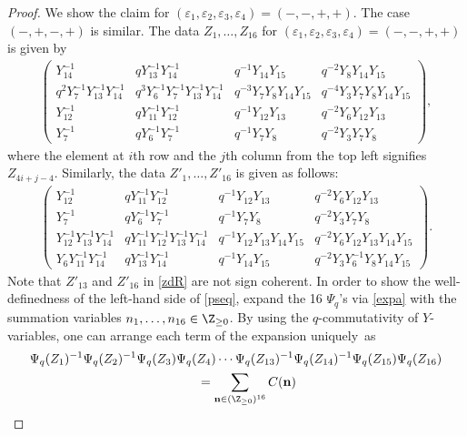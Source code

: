 \begin{proof}
 We show the claim for
 $(\varepsilon_1,\varepsilon_2,\varepsilon_3,\varepsilon_4)
 =(-,-,+,+)$. The case $(-,+,-,+)$ is similar. The data $Z_1,
 \dots, Z_{16}$ for
 $(\varepsilon_1,\varepsilon_2,\varepsilon_3,\varepsilon_4)=(-,-,+,+)$
 is given by
\begin{align}\label{zdL}
\begin{pmatrix}
Y_{14}^{-1} &
qY^{-1}_{13}Y^{-1}_{14} &
q^{-1}Y_{14}Y_{15} &
q^{-2}Y_{8}Y_{14}Y_{15}
\\
q^{2}Y^{-1}_7Y^{-1}_{13}Y^{-1}_{14} &
q^3Y^{-1}_6Y^{-1}_7Y^{-1}_{13}Y^{-1}_{14} &
q^{-3}Y_7Y_8Y_{14}Y_{15} &
q^{-4}Y_3Y_7Y_8Y_{14}Y_{15}
\\
Y^{-1}_{12} &
qY^{-1}_{11}Y^{-1}_{12} &
q^{-1}Y_{12}Y_{13}&
q^{-2}Y_6Y_{12} Y_{13}
\\
Y^{-1}_{7} &
qY^{-1}_6Y^{-1}_7 &
q^{-1}Y_7Y_8 &
q^{-2}Y_3Y_7Y_8
\end{pmatrix},
\end{align}
where the element at $i$th row and the $j$th column from the top left signifies
$Z_{4i+j-4}$.
%
Similarly,
the data $Z'_1, \dotsc, Z'_{16}$
is given as follows:
\begin{align}\label{zdR}
\begin{pmatrix}
Y^{-1}_{12} &
qY^{-1}_{11}Y^{-1}_{12} &
q^{-1}Y_{12} Y_{13}&
q^{-2}Y_6Y_{12} Y_{13}
\\
Y^{-1}_7 &
qY^{-1}_6Y^{-1}_7 &
q^{-1}Y_7Y_8 &
q^{-2}Y_3Y_7Y_8
\\
Y^{-1}_{12}Y^{-1}_{13}Y^{-1}_{14} &
qY^{-1}_{11}Y^{-1}_{12}Y^{-1}_{13}Y^{-1}_{14} &
q^{-1}Y_{12} Y_{13} Y_{14} Y_{15} &
q^{-2}Y_6Y_{12} Y_{13} Y_{14} Y_{15}
\\
Y_6Y^{-1}_{11}Y^{-1}_{14} &
qY^{-1}_{13}Y^{-1}_{14} &
q^{-1}Y_{14}Y_{15} &
q^{-2}Y_3Y^{-1}_6Y_8Y_{14}Y_{15}
\end{pmatrix}.
\end{align}
%
Note that $Z'_{13}$ and $Z'_{16}$ in \eqref{zdR} are not sign
coherent. In order to show the well-definedness of the left-hand side of
\eqref{pseq}, expand the 16 $\Psi_q$'s via \eqref{expa} with the
summation variables $n_1, \dots, n_{16} \in \Z_{\ge 0}$. By using
the $q$-commutativity of $Y$-variables, one can arrange each term of
the expansion uniquely~as
\begin{gather}
\Psi_q(Z_1)^{-1}\Psi_q(Z_2)^{-1}\Psi_q(Z_3)\Psi_q(Z_4)
\dotsm \Psi_q(Z_{13})^{-1}\Psi_q(Z_{14})^{-1}\Psi_q(Z_{15})\Psi_q(Z_{16})\nonumber
 \\
 \qquad= \sum_{\mathbf{n} \in (\Z_{\ge 0})^{16}}C(\mathbf{n})

\end{gather}
\end{proof}
